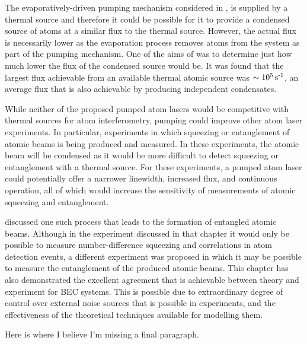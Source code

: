 The evaporatively-driven pumping mechanism considered in , is supplied by a thermal source and therefore it could be possible for it to provide a condensed source of atoms at a similar flux to the thermal source.  However, the actual flux is necessarily lower as the evaporation process removes atoms from the system as part of the pumping mechanism.  One of the aims of  was to determine just how much lower the flux of the condensed source would be.  It was found that the largest flux achievable from an available thermal atomic source was $\sim\unit[10^5]{s\textsuperscript{-1}}$, an average flux that is also achievable by producing independent condensates.

While neither of the proposed pumped atom lasers would be competitive with thermal sources for atom interferometry, pumping could improve other atom laser experiments.  In particular, experiments in which squeezing or entanglement of atomic beams is being produced and measured.  In these experiments, the atomic beam will be condensed as it would be more difficult to detect squeezing or entanglement with a thermal source.  For these experiments, a pumped atom laser could potentially offer a narrower linewidth, increased flux, and continuous operation, all of which would increase the sensitivity of measurements of atomic squeezing and entanglement.

 discussed one such process that leads to the formation of entangled atomic beams.  Although in the experiment discussed in that chapter it would only be possible to measure number-difference squeezing and correlations in atom detection events, a different experiment was proposed in which it may be possible to measure the entanglement of the produced atomic beams.  This chapter has also demonstrated the excellent agreement that is achievable between theory and experiment for BEC systems.  This is possible due to extraordinary degree of control over external noise sources that is possible in experiments, and the effectiveness of the theoretical techniques available for modelling them.

Here is where I believe I'm missing a final paragraph.


